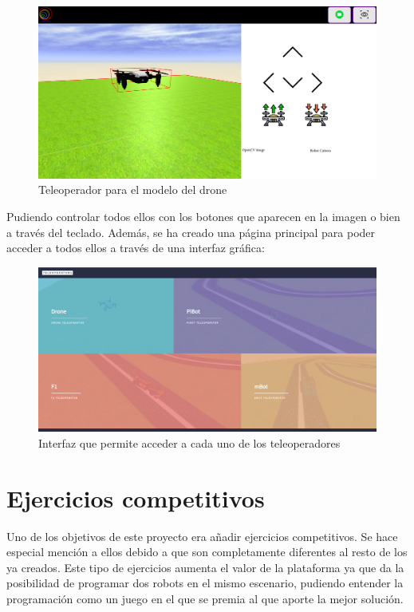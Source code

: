 \begin{figure}[H]
    \centering
    \includegraphics[scale=0.3]{img/drone_teleoperator.png}
    \caption{Teleoperador para el modelo del drone} \label{fig:drone_teleoperator}
\end{figure}
    
Pudiendo controlar todos ellos con los botones que aparecen en la imagen o bien a través del teclado. 
Además, se ha creado una página principal para poder acceder a todos ellos a través de una interfaz gráfica: 

 \begin{figure}[H]
    \centering
    \includegraphics[scale=0.25]{img/teleoperators.png}
    \caption{Interfaz que permite acceder a cada uno de los teleoperadores} \label{fig:teleoperators}
\end{figure}

\section{Ejercicios competitivos}

Uno de los objetivos de este proyecto era añadir ejercicios competitivos. Se hace especial mención a ellos debido a que son completamente diferentes al resto de los ya creados. Este tipo de ejercicios aumenta el valor de la plataforma ya que da la posibilidad de programar dos robots en el mismo escenario, pudiendo entender la programación como un juego en el que se premia al que aporte la mejor solución.

